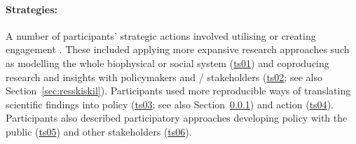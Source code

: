 \paragraph{Strategies:} A number of participants' strategic actions involved utilising or creating engagement \skitech. These included applying more expansive research approaches such as modelling the whole biophysical or social system (\hyperref[tab:resskitechstrat]{ts01}) and coproducing research and insights with policymakers and / stakeholders (\hyperref[tab:resskitechstrat]{ts02}; see also Section~\ref{sec:resskiskil}). Participants used more reproducible ways of translating scientific findings into policy \skifram{} (\hyperref[tab:resskitechstrat]{ts03}; see also Section~\ref{sec:resskifram}) and action (\hyperref[tab:resskitechstrat]{ts04}). Participants also described participatory approaches developing policy with the public (\hyperref[tab:resskitechstrat]{ts05}) and other stakeholders (\hyperref[tab:resskitechstrat]{ts06}).

\subsubsection{\titfram}\label{sec:resskifram}


